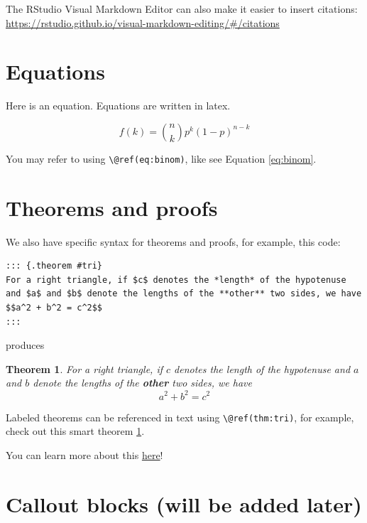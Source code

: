 \documentclass[
]{book}
\newtheorem{theorem}{Theorem}[chapter]
\theoremstyle{definition}
\theoremstyle{definition}
\theoremstyle{definition}
\theoremstyle{definition}
\theoremstyle{remark}
\begin{document}
The RStudio Visual Markdown Editor can also make it easier to insert citations: \url{https://rstudio.github.io/visual-markdown-editing/\#/citations}

\section{Equations}\label{equations}

Here is an equation. Equations are written in latex.

\begin{equation}
  f\left(k\right) = \binom{n}{k} p^k\left(1-p\right)^{n-k}
  \label{eq:binom}
\end{equation}

You may refer to using \texttt{\textbackslash{}@ref(eq:binom)}, like see Equation \eqref{eq:binom}.

\section{Theorems and proofs}\label{theorems-and-proofs}

We also have specific syntax for theorems and proofs, for example, this code:

\begin{verbatim}
::: {.theorem #tri}
For a right triangle, if $c$ denotes the *length* of the hypotenuse
and $a$ and $b$ denote the lengths of the **other** two sides, we have
$$a^2 + b^2 = c^2$$
:::
\end{verbatim}

produces

\begin{theorem}
\protect\hypertarget{thm:tri}{}\label{thm:tri}For a right triangle, if \(c\) denotes the \emph{length} of the hypotenuse and \(a\) and \(b\) denote the lengths of the \textbf{other} two sides, we have \[a^2 + b^2 = c^2\]
\end{theorem}

Labeled theorems can be referenced in text using \texttt{\textbackslash{}@ref(thm:tri)}, for example, check out this smart theorem \ref{thm:tri}.

You can learn more about this \href{https://bookdown.org/yihui/bookdown/markdown-extensions-by-bookdown.html}{here}!

\section{Callout blocks (will be added later)}\label{callout-blocks-will-be-added-later}
\end{document}
